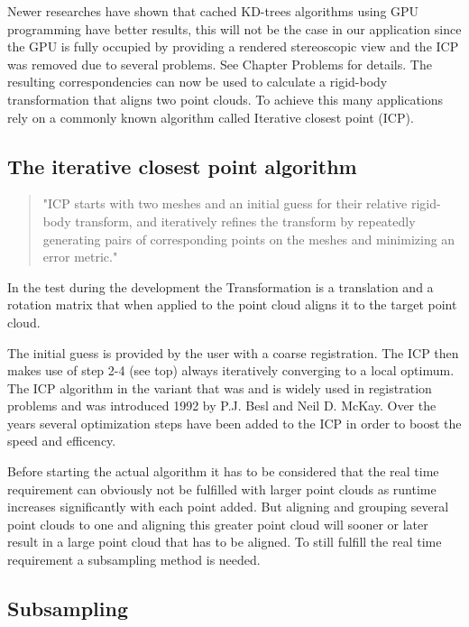 \documentclass[hyperref,english,bachelorofscience,bibnum]{cgvpub}
\begin{document}
Newer researches have shown that cached KD-trees algorithms using GPU programming have better results\cite{Garcia2008}, this will not be the case in our application since the GPU is fully occupied by providing a rendered stereoscopic view and the ICP was removed due to several problems. See Chapter Problems for details.
The resulting correspondencies can now be used to calculate a rigid-body transformation that aligns two point clouds. To achieve this many applications rely on a commonly known algorithm called Iterative closest point (ICP).

\subsection{The iterative closest point algorithm}

\begin{quote}
"ICP starts with two meshes and an initial guess for their relative rigid-body transform, and iteratively refines the transform by repeatedly generating pairs of corresponding points on the meshes and minimizing an error metric."\cite{Rusinkiewicza}
\end{quote}
In the test during the development the Transformation is a translation and a rotation matrix that when applied to the point cloud aligns it to the target point cloud.

The initial guess is provided by the user with a coarse registration. The ICP then makes use of step 2-4 (see top) always iteratively converging to a local optimum.\cite{Besl92}
The ICP algorithm in the variant that was and is widely used in registration problems and was introduced 1992 by P.J. Besl and Neil D. McKay\cite{Besl92}. Over the years several optimization steps have been added to the ICP in order to boost the speed and efficency.

Before starting the actual algorithm it has to be considered that the real time requirement can obviously not be fulfilled with larger point clouds as runtime increases significantly with each point added. But aligning and grouping several point clouds to one and aligning this greater point cloud will sooner or later result in a large point cloud that has to be aligned. To still fulfill the real time requirement a subsampling method is needed.

\subsection{Subsampling}
\end{document}
